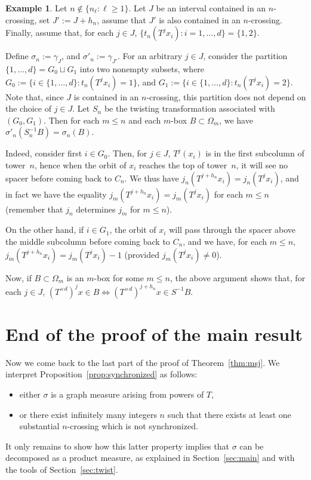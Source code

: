 \documentclass[10pt]{amsart}
\theoremstyle{definition}\newtheorem{defi}[theo]{Definition}\newtheorem{rema}[theo]{Remark}\newtheorem{exam}[theo]{Example}\newtheorem{exem}[theo]{Example}\newtheorem{nota}[theo]{Notation}
\newcommand{\egdef}{:=}
\newcommand{\td}{T^{\times d}}
\newcommand{\ovC}{\Omega}
\newtheorem{example}[theo]{Example}
\begin{document}
\begin{example}\label{Ex:twist}
Let $n \notin \{n_\ell: \ell\ge1\}$. Let $J$ be an interval contained in an $n$-crossing, set $J'\egdef J+h_n$, assume that $J'$ is also contained in an $n$-crossing. Finally, assume that, for each $j\in J$, $\bigl\{ t_n(T^jx_i): i=1,\ldots,d\bigr\}=\{1,2\}$.

Define $\sigma_n\egdef \gamma_J$, and $\sigma'_n\egdef\gamma_{J'}$. For an arbitrary $j\in J$, consider the partition $\{1,\ldots,d\}=G_0\sqcup G_1$ into two nonempty subsets, where $G_0\egdef\bigl\{i\in\{1,\ldots,d\}: t_n(T^jx_i)=1\bigr\}$, and $G_1\egdef\bigl\{i\in\{1,\ldots,d\}: t_n(T^jx_i)=2\bigr\}$. Note that, since $J$ is contained in an $n$-crossing, this partition does not depend on the choice of $j\in J$. Let $S_n$ be the twisting transformation associated with $(G_0,G_1)$. Then for each $m\le n$ and each $m$-box $B\subset \ovC_m$, we have $\sigma'_n(S_n^{-1}B)=\sigma_n(B)$.

Indeed, consider first $i\in G_0$. Then, for $j\in J$, $T^j(x_i)$ is in the first subcolumn of tower~$n$, hence when the orbit of $x_i$ reaches the top of tower~$n$, it will see no spacer before coming back to $C_n$. We thus have $j_n(T^{j+h_n}x_i)=j_n(T^jx_i)$, and in fact we have the equality $j_m(T^{j+h_n}x_i)=j_m(T^jx_i)$ for each $m\le n$ (remember that $j_n$ determines $j_m$ for $m\le n$).

On the other hand, if $i\in G_1$, the orbit of $x_i$ will pass through the spacer above the middle subcolumn before coming back to $C_n$, and we have, for each $m\le n$, $j_m(T^{j+h_n}x_i)=j_m(T^jx_i)-1$ (provided $j_m(T^jx_i)\neq 0$).

Now, if $B\subset\ovC_m$ is an $m$-box for some $m\le n$, the above argument shows that, for each $j\in J$, $(\td)^jx\in B\Longleftrightarrow (\td)^{j+h_n}x\in S^{-1}B$.
\end{example}


\section{End of the proof of the main result}\label{sec:end}
Now we come back to the last part of the proof of Theorem~\ref{thm:msj}. We interpret Proposition~\ref{prop:synchronized} as follows:
\begin{itemize}
\item either $\sigma$ is a graph measure arising from powers of $T$,
\item or there exist infinitely many integers $n$ such that there exists at least one substantial $n$-crossing which is not synchronized.
\end{itemize}
It only remains to show how this latter property implies that $\sigma$ can be decomposed as a product measure, as explained in Section~\ref{sec:main} and with the tools of Section~\ref{sec:twist}.
\end{document}
